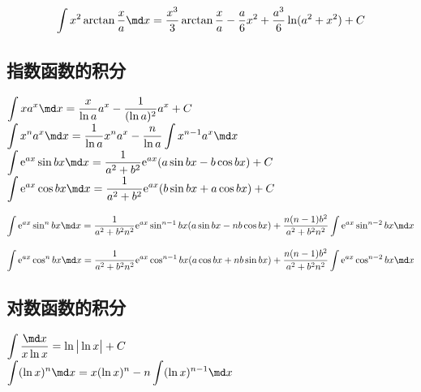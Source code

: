 \[
    \int x^2 \arctan \dfrac{x}{a} \md x= \dfrac{x^3}{3} \arctan \dfrac{x}{a} - \dfrac{a}{6}x^2 + \dfrac{a^3}{6} \ln (a^2+x^2)+C
\]

\subsection*{指数函数的积分}

\begin{multicols}{2}
    \(\displaystyle \int x a^x \md x = \dfrac{x}{\ln a}a^x-\dfrac{1}{(\ln a)^2}a^x+C\) \\
    \(\displaystyle \int x^n a^x \md x= \dfrac{1}{\ln a}x^n a^x-\dfrac{n}{\ln a}\int x^{n-1}a^x \md x\) \\
    \(\displaystyle \int \mathrm{e}^{ax} \sin bx \md x = \dfrac{1}{a^2+b^2}\mathrm{e}^{ax}(a \sin bx - b \cos bx)+C\) \\
    \(\displaystyle \int \mathrm{e}^{ax} \cos bx \md x = \dfrac{1}{a^2+b^2}\mathrm{e}^{ax}(b \sin bx + a \cos bx)+C\)
\end{multicols}

\[
    \int \mathrm{e}^{ax} \sin ^ n bx \md x=\dfrac{1}{a^2+b^2 n^2}\mathrm{e}^{ax} \sin ^ {n-1} bx (a \sin bx -nb \cos bx) +\dfrac{n(n-1)b^2}{a^2+b^2 n^2}\int \mathrm{e}^{ax} \sin ^{n-2} bx \md x
\]

\[
    \int \mathrm{e}^{ax} \cos ^ n bx \md x=\dfrac{1}{a^2+b^2 n^2}\mathrm{e}^{ax} \cos ^ {n-1} bx (a \cos bx +nb \sin bx) +\dfrac{n(n-1)b^2}{a^2+b^2 n^2}\int \mathrm{e}^{ax} \cos ^{n-2} bx \md x
\]

\subsection*{对数函数的积分}

\begin{multicols}{2}
    \(\displaystyle \int \dfrac{\md x}{x \ln x} =\ln \big | \ln x \big |+C\) \\
    \(\displaystyle \int (\ln x)^{n} \md x = x(\ln x)^ n - n \int (\ln x)^{n-1} \md x\)
\end{multicols}
